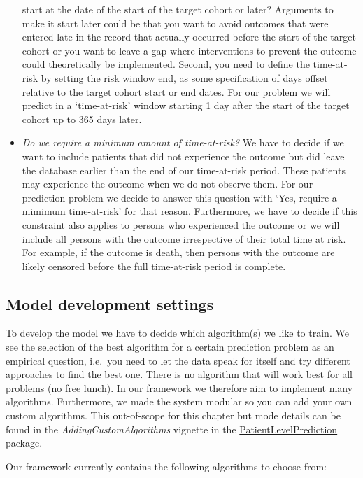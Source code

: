\documentclass[]{book}
\begin{document}
\begin{itemize}
  start at the date of the start of the target cohort or later?
  Arguments to make it start later could be that you want to avoid
  outcomes that were entered late in the record that actually occurred
  before the start of the target cohort or you want to leave a gap where
  interventions to prevent the outcome could theoretically be
  implemented. Second, you need to define the time-at-risk by setting
  the risk window end, as some specification of days offset relative to
  the target cohort start or end dates. For our problem we will predict
  in a `time-at-risk' window starting 1 day after the start of the
  target cohort up to 365 days later.
\item
  \emph{Do we require a minimum amount of time-at-risk?} We have to
  decide if we want to include patients that did not experience the
  outcome but did leave the database earlier than the end of our
  time-at-risk period. These patients may experience the outcome when we
  do not observe them. For our prediction problem we decide to answer
  this question with `Yes, require a mimimum time-at-risk' for that
  reason. Furthermore, we have to decide if this constraint also applies
  to persons who experienced the outcome or we will include all persons
  with the outcome irrespective of their total time at risk. For
  example, if the outcome is death, then persons with the outcome are
  likely censored before the full time-at-risk period is complete.
\end{itemize}

\subsection{Model development
settings}\label{model-development-settings}

To develop the model we have to decide which algorithm(s) we like to
train. We see the selection of the best algorithm for a certain
prediction problem as an empirical question, i.e.~you need to let the
data speak for itself and try different approaches to find the best one.
There is no algorithm that will work best for all problems (no free
lunch). In our framework we therefore aim to implement many algorithms.
Furthermore, we made the system modular so you can add your own custom
algorithms. This out-of-scope for this chapter but mode details can be
found in the \emph{AddingCustomAlgorithms} vignette in the
\href{https://ohdsi.github.io/PatientLevelPrediction/}{PatientLevelPrediction}
package.

Our framework currently contains the following algorithms to choose
from:
\end{document}
